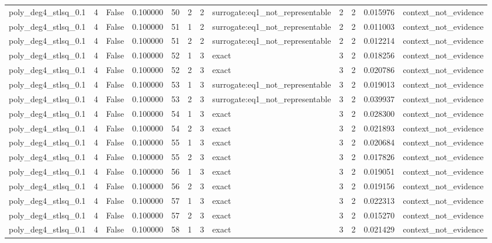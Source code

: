\begin{tabular}{lrrrrrrlrrrl}
poly\_deg4\_stlsq\_0.1 & 4 & False & 0.100000 & 50 & 2 & 2 & surrogate:eq1\_not\_representable & 2 & 2 & 0.015976 & context\_not\_evidence \\
poly\_deg4\_stlsq\_0.1 & 4 & False & 0.100000 & 51 & 1 & 2 & surrogate:eq1\_not\_representable & 2 & 2 & 0.011003 & context\_not\_evidence \\
poly\_deg4\_stlsq\_0.1 & 4 & False & 0.100000 & 51 & 2 & 2 & surrogate:eq1\_not\_representable & 2 & 2 & 0.012214 & context\_not\_evidence \\
poly\_deg4\_stlsq\_0.1 & 4 & False & 0.100000 & 52 & 1 & 3 & exact & 3 & 2 & 0.018256 & context\_not\_evidence \\
poly\_deg4\_stlsq\_0.1 & 4 & False & 0.100000 & 52 & 2 & 3 & exact & 3 & 2 & 0.020786 & context\_not\_evidence \\
poly\_deg4\_stlsq\_0.1 & 4 & False & 0.100000 & 53 & 1 & 3 & surrogate:eq1\_not\_representable & 3 & 2 & 0.019013 & context\_not\_evidence \\
poly\_deg4\_stlsq\_0.1 & 4 & False & 0.100000 & 53 & 2 & 3 & surrogate:eq1\_not\_representable & 3 & 2 & 0.039937 & context\_not\_evidence \\
poly\_deg4\_stlsq\_0.1 & 4 & False & 0.100000 & 54 & 1 & 3 & exact & 3 & 2 & 0.028300 & context\_not\_evidence \\
poly\_deg4\_stlsq\_0.1 & 4 & False & 0.100000 & 54 & 2 & 3 & exact & 3 & 2 & 0.021893 & context\_not\_evidence \\
poly\_deg4\_stlsq\_0.1 & 4 & False & 0.100000 & 55 & 1 & 3 & exact & 3 & 2 & 0.020684 & context\_not\_evidence \\
poly\_deg4\_stlsq\_0.1 & 4 & False & 0.100000 & 55 & 2 & 3 & exact & 3 & 2 & 0.017826 & context\_not\_evidence \\
poly\_deg4\_stlsq\_0.1 & 4 & False & 0.100000 & 56 & 1 & 3 & exact & 3 & 2 & 0.019051 & context\_not\_evidence \\
poly\_deg4\_stlsq\_0.1 & 4 & False & 0.100000 & 56 & 2 & 3 & exact & 3 & 2 & 0.019156 & context\_not\_evidence \\
poly\_deg4\_stlsq\_0.1 & 4 & False & 0.100000 & 57 & 1 & 3 & exact & 3 & 2 & 0.022313 & context\_not\_evidence \\
poly\_deg4\_stlsq\_0.1 & 4 & False & 0.100000 & 57 & 2 & 3 & exact & 3 & 2 & 0.015270 & context\_not\_evidence \\
poly\_deg4\_stlsq\_0.1 & 4 & False & 0.100000 & 58 & 1 & 3 & exact & 3 & 2 & 0.021429 & context\_not\_evidence \\

\end{tabular}
